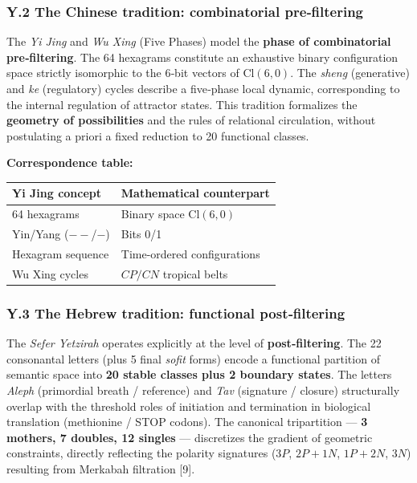 \documentclass[11pt]{article}
\begin{document}
\hypertarget{y.2-the-chinese-tradition-combinatorial-prefiltering}{%
\subsubsection{Y.2 The Chinese tradition: combinatorial
pre‑filtering}\label{y.2-the-chinese-tradition-combinatorial-prefiltering}}

The \emph{Yi Jing} and \emph{Wu Xing} (Five Phases) model the
\textbf{phase of combinatorial pre‑filtering}. The 64 hexagrams
constitute an exhaustive binary configuration space strictly isomorphic
to the 6‑bit vectors of \(\mathrm{Cl}(6,0)\). The \emph{sheng}
(generative) and \emph{ke} (regulatory) cycles describe a five‑phase
local dynamic, corresponding to the internal regulation of attractor
states. This tradition formalizes the \textbf{geometry of possibilities}
and the rules of relational circulation, without postulating a priori a
fixed reduction to 20 functional classes.

\textbf{Correspondence table:}

\begin{longtable}[]{@{}ll@{}}
\toprule
Yi Jing concept & Mathematical counterpart \\
\midrule
\endhead
64 hexagrams & Binary space \(\mathrm{Cl}(6,0)\) \\
Yin/Yang (\(--\)/\(-\)) & Bits 0/1 \\
Hexagram sequence & Time-ordered configurations \\
Wu Xing cycles & \(CP/CN\) tropical belts \\
\bottomrule
\end{longtable}

\hypertarget{y.3-the-hebrew-tradition-functional-postfiltering}{%
\subsubsection{Y.3 The Hebrew tradition: functional
post‑filtering}\label{y.3-the-hebrew-tradition-functional-postfiltering}}

The \emph{Sefer Yetzirah} operates explicitly at the level of
\textbf{post‑filtering}. The 22 consonantal letters (plus 5 final
\emph{sofit} forms) encode a functional partition of semantic space into
\textbf{20 stable classes plus 2 boundary states}. The letters
\emph{Aleph} (primordial breath / reference) and \emph{Tav} (signature /
closure) structurally overlap with the threshold roles of initiation and
termination in biological translation (methionine / STOP codons). The
canonical tripartition --- \textbf{3 mothers, 7 doubles, 12 singles} ---
discretizes the gradient of geometric constraints, directly reflecting
the polarity signatures (\(3P\), \(2P+1N\), \(1P+2N\), \(3N\)) resulting
from Merkabah filtration {[}9{]}.
\end{document}
